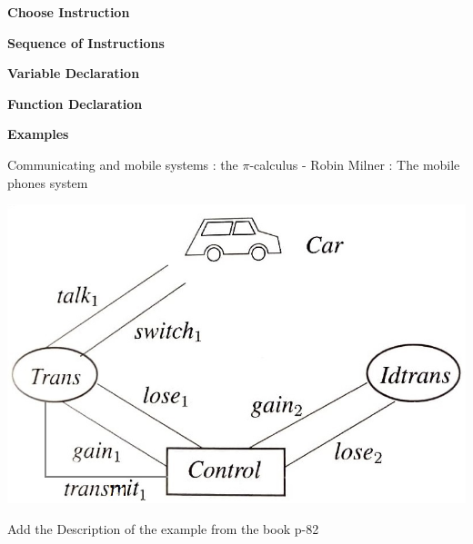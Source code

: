 \documentclass[11pt]{report}
\begin{document}
\tabto{0cm} {\large \textbf{Choose Instruction}}
\begin{prooftree}
\end{prooftree}

\tabto{0cm} {\large \textbf{Sequence of Instructions}}
\begin{prooftree}
\end{prooftree}

\newpage

\tabto{0cm} {\large \textbf{Variable Declaration}}
\begin{prooftree}
\end{prooftree}

\tabto{0cm} {\large \textbf{Function Declaration}}
\begin{prooftree}
\end{prooftree}

\newpage
\centerline{\textbf{\Huge Examples}}
\vspace*{3pt}
\vspace*{20pt}
Communicating and mobile systems : the $\pi$-calculus - Robin Milner : The mobile phones system

\begin{center}
\includegraphics[scale = 0.5]{mobile-phone-system.jpg}
\end{center}
Add the Description of the example from the book p-82
\end{document}
